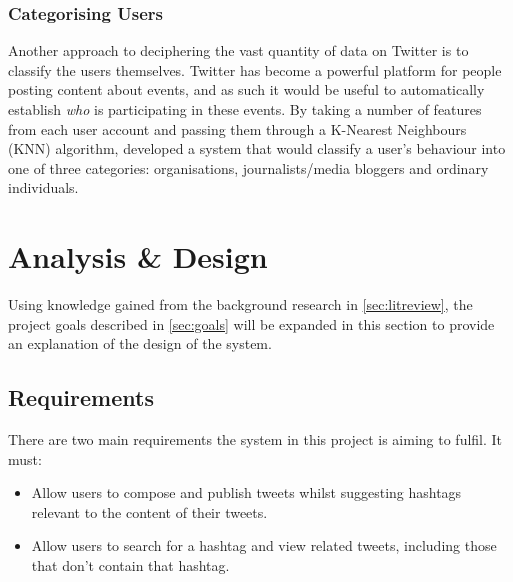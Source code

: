 \documentclass[12pt,a4paper]{article}
\begin{document}
\subsubsection{Categorising Users}
Another approach to deciphering the vast quantity of data on Twitter is to classify the users themselves. Twitter has become a powerful platform for people posting content about events, and as such it would be useful to automatically establish \emph{who} is participating in these events. By taking a number of features from each user account and passing them through a K-Nearest Neighbours (KNN) algorithm, \textcite{DeChoudhury:2012} developed a system that would classify a user's behaviour into one of three categories: organisations, journalists/media bloggers and ordinary individuals.

\pagebreak

\section{Analysis \& Design}
Using knowledge gained from the background research in \autoref{sec:litreview}, the project goals described in \autoref{sec:goals} will be expanded in this section to provide an explanation of the design of the system.

\subsection{Requirements}
There are two main requirements the system in this project is aiming to fulfil. It must:
\begin{itemize}
    \item Allow users to compose and publish tweets whilst suggesting hashtags relevant to the content of their tweets.
    \item Allow users to search for a hashtag and view related tweets, including those that don't contain that hashtag.
\end{itemize}
\end{document}
